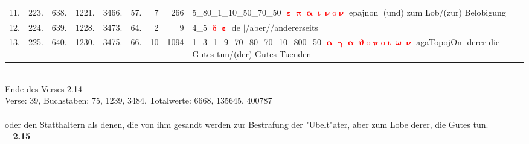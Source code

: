 \documentclass[a4paper,10pt,landscape]{article}
\begin{document}
\begin{tabular}{rrrrrrrrp{120mm}}
11.&223.&638.&1221.&3466.&57.&7&266&5\_80\_1\_10\_50\_70\_50 \textcolor{red}{$\boldsymbol{\upepsilon\uppi\upalpha\upiota\upnu\mathrm{o}\upnu}$} epajnon $|$(und) zum Lob/(zur) Belobigung\\
12.&224.&639.&1228.&3473.&64.&2&9&4\_5 \textcolor{red}{$\boldsymbol{\updelta\upepsilon}$} de $|$/aber//andererseits\\
13.&225.&640.&1230.&3475.&66.&10&1094&1\_3\_1\_9\_70\_80\_70\_10\_800\_50 \textcolor{red}{$\boldsymbol{\upalpha\upgamma\upalpha\upvartheta\mathrm{o}\uppi\mathrm{o}\upiota\upomega\upnu}$} agaTopojOn $|$derer die Gutes tun/(der) Gutes Tuenden\\
\end{tabular}\medskip \\
Ende des Verses 2.14\\
Verse: 39, Buchstaben: 75, 1239, 3484, Totalwerte: 6668, 135645, 400787\\
\\
oder den Statthaltern als denen, die von ihm gesandt werden zur Bestrafung der "Ubelt"ater, aber zum Lobe derer, die Gutes tun.\\
\newpage 
{\bf -- 2.15}\\
\medskip \\
\end{document}
